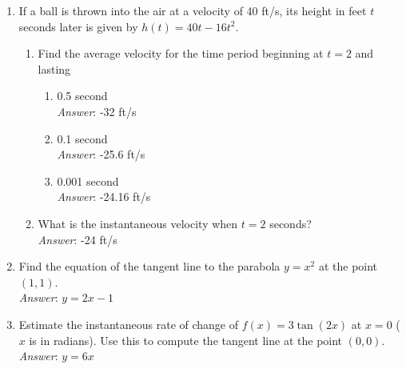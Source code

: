 \documentclass[11pt]{article}
\begin{document}
\begin{enumerate}

\item If a ball is thrown into the air at a velocity of 40 ft/s, its height in feet $t$ seconds later is given by $h(t)=40t-16t^2$.

\begin{enumerate}

\item Find the average velocity for the time period beginning at $t=2$ and lasting  

\begin{enumerate}

\item 0.5 second\\

{\em Answer}: -32 ft/s\\

\item 0.1 second\\

{\em Answer}: -25.6 ft/s\\

\item 0.001 second\\

{\em Answer}: -24.16 ft/s\\

\end{enumerate}



\item What is the instantaneous velocity when $t=2$ seconds?\\

{\em Answer}: -24 ft/s\\



\end{enumerate}

\item Find the equation of the tangent line to the parabola $y=x^2$ at the point $(1,1)$.\\

{\em Answer}: $y=2x-1$\\

\item Estimate the instantaneous rate of change of $f(x)=3\tan(2x)$ at $x=0$ ($x$ is in radians). Use this to compute the tangent line at the point $(0,0)$.  \\

{\em Answer}: $y=6x$\\



\end{enumerate}
\end{document}
